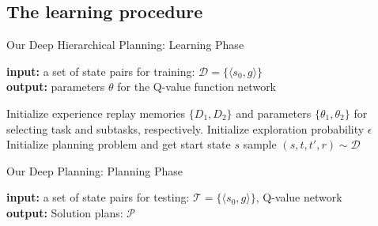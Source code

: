 \documentclass[letterpaper]{article}
\begin{document}
\subsection{The learning procedure}

\begin{algorithm}[!ht]
\caption{Our Deep Hierarchical Planning: Learning Phase}
\label{algorithm:learning}
\textbf{input:} a set of state pairs for training: $\mathcal{D}=\{\langle s_0,g\rangle\}$\\
\textbf{output:} parameters $\theta$ for the Q-value function network 

\begin{algorithmic}[1]
\STATE Initialize experience replay memories $\{D_1,D_2\}$ and parameters $\{\theta_1,\theta_2\}$ for selecting task and subtasks, respectively.
\STATE Initialize exploration probability $\epsilon$
	\STATE Initialize planning problem and get start state $s$
	\STATE 
\ENDFOR
\STATE sample $(s,t,t',r)\sim \mathcal{D}$

\end{algorithmic}
\end{algorithm}

\begin{algorithm}[!ht]
\caption{Our Deep Planning: Planning Phase}
\label{algorithm:planning}
\textbf{input:} a set of state pairs for testing: $\mathcal{T}=\{\langle s_0,g\rangle\}$, Q-value network \\
\textbf{output:} Solution plans: $\mathcal{P}$ 

\begin{algorithmic}[1]
\STATE 

\end{algorithmic}
\end{algorithm}
\end{document}
